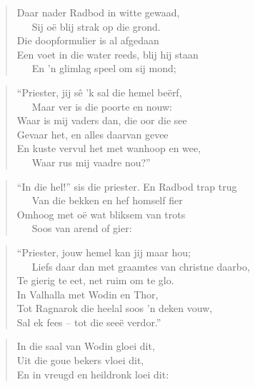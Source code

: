 \begin{verse}
Daar nader Radbod in witte gewaad, \\ 
\ \ \ Sij o\"e blij strak op die grond. \\ 
Die doopformulier is al afgedaan \\ 
Een voet in die water reeds, blij hij staan \\ 
\ \ \ En ’n glimlag speel om sij mond; \\ 
\end{verse}

\begin{verse}
``Priester, jij sê ’k sal die hemel be\"erf, \\ 
\ \ \ Maar ver is die poorte en nouw: \\ 
Waar is mij vaders dan, die oor die see \\ 
Gevaar het, en alles daarvan gevee \\ 
En kuste vervul het met wanhoop en wee, \\ 
\ \ \ Waar rus mij vaadre nou?'' \\ 
\end{verse}

\begin{verse}
``In die hel!'' sis die priester. En Radbod trap trug \\ 
\ \ \ Van die bekken en hef homself fier \\ 
Omhoog met o\"e wat bliksem van trots \\ 
\ \ \ Soos van arend of gier: \\ 
\end{verse}

\begin{verse}
``Priester, jouw hemel kan jij maar hou; \\ 
\ \ \ Liefs daar dan met graamtes van christne daarbo, \\ 
Te gierig te eet, net ruim om te glo. \\ 
In Valhalla met Wodin en Thor, \\ 
Tot Ragnarok die heelal soos ’n deken vouw, \\ 
Sal ek fees -- tot die see\"e verdor.'' \\ 
\end{verse}

\begin{verse}
In die saal van Wodin gloei dit, \\ 
Uit die goue bekers vloei dit, \\ 
En in vreugd en heildronk loei dit: \\ 
\end{verse}

